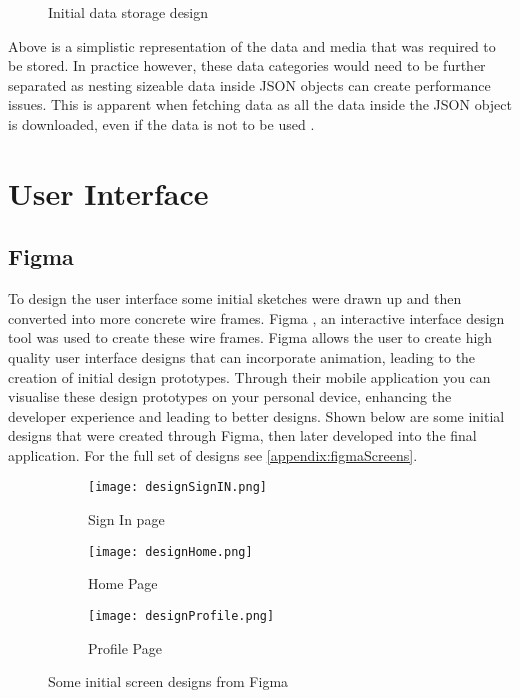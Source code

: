 \begin{figure}[!htbp]
    \centering
    \begin{subfigure}[b]{0.6\textwidth}
    \end{subfigure}
    \caption{Initial data storage design} 
    \label{fig:dataDesign}
\end{figure}
\FloatBarrier

Above is a simplistic representation of the data and media that was required to be stored.
In practice however, these data categories would need to be further separated as nesting sizeable data inside JSON objects can create performance issues. This is apparent when fetching data as all the data inside the JSON object is downloaded, even if the data is not to be used \cite{fbStructData}.

\section{User Interface}\label{UIDesign}
\subsection*{Figma}
To design the user interface some initial sketches were drawn up and then converted into more concrete wire frames. Figma \cite{figma}, an interactive interface design tool was used to create these wire frames. Figma allows the user to create high quality user interface designs that can incorporate animation, leading to the creation of initial design prototypes. Through their mobile application you can visualise these design prototypes on your personal device, enhancing the developer experience and leading to better designs. Shown below are some initial designs that were created through Figma, then later developed into the final application. For the full set of designs see \ref{appendix:figmaScreens}.

\begin{figure}[!htbp]
    \centering
    \begin{subfigure}[b]{0.25\textwidth}
        \texttt{[image: designSignIN.png]}
        \caption{Sign In page}
    \end{subfigure}
    \hspace{1.5em}
    \begin{subfigure}[b]{0.25\textwidth}
        \texttt{[image: designHome.png]}
        \caption{Home Page}
    \end{subfigure}
    \hspace{1.5em}
    \begin{subfigure}[b]{0.25\textwidth}
        \texttt{[image: designProfile.png]}
        \caption{Profile Page}
    \end{subfigure}
    \caption{Some initial screen designs from Figma}
    \label{fig:figma}
\end{figure}
\FloatBarrier

